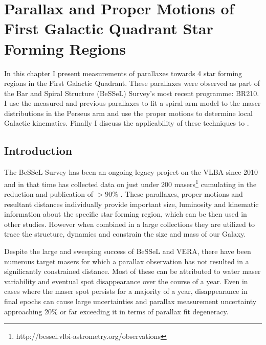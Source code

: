 \chapter{Parallax and Proper Motions of First Galactic Quadrant Star Forming Regions}\label{chap:chapter3}
	\onehalfspacing    
	
	\vspace{5cm}
	In this chapter I present measurements of parallaxes towards 4 star forming regions in the First Galactic Quadrant. These parallaxes were observed as part of the Bar and Spiral Structure (BeSSeL) Survey's most recent programme: BR210.  I use the measured and previous parallaxes to fit a spiral arm model to the maser distributions in the Perseus arm and use the proper motions to determine local Galactic kinematics. Finally I discuss the applicability of these techniques to \spirals.
    
    \singlespacing

        
        \newpage
    \section{Introduction}
        The BeSSeL Survey has been an ongoing legacy project on the VLBA since 2010 and in that time has collected data on just under 200 masers\footnote{http://bessel.vlbi-astrometry.org/observations} cumulating in the reduction and publication of $>90\%$ \citep[][not including parallaxes published as part of the VERA project]{Reid2019}. These parallaxes, proper motions and resultant distances individually provide important size, luminosity and kinematic information about the specific star forming region, which can be then used in other studies. However when combined in a large collections they are utilized to trace the structure, dynamics and constrain the size and mass of our Galaxy.
        
        Despite the large and sweeping success of BeSSeL and VERA, there have been numerous target masers for which a parallax observation has not resulted in a significantly constrained distance. Most of these can be attributed to water maser variability and eventual spot disappearance over the course of a year. Even in cases where the maser spot persists for a majority of a year, disappearance in final epochs can cause large uncertainties and parallax measurement uncertainty approaching 20\% or far exceeding it in terms of parallax fit degeneracy.
        
